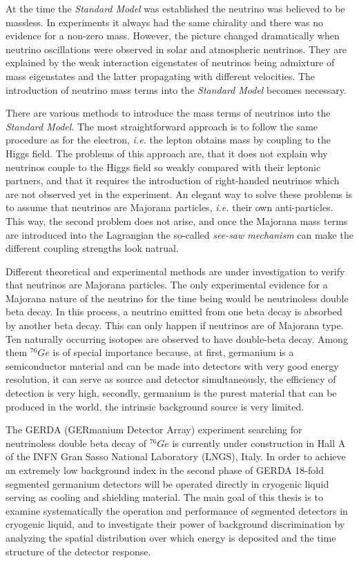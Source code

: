 At the time the \emph{Standard Model} was established the neutrino was
believed to be massless. In experiments it always had the same
chirality and there was no evidence for a non-zero mass. However, the
picture changed dramatically when neutrino oscillations were observed
in solar and atmospheric neutrinos. They are explained by the weak
interaction eigenstates of neutrinos being admixture of mass
eigenstates and the latter propagating with different velocities. The
introduction of neutrino mass terms into the \emph{Standard Model}
becomes necessary.

There are various methods to introduce the mass terms of neutrinos
into the \emph{Standard Model}. The most straightforward approach is
to follow the same procedure as for the electron, \textit{i.e.} the
lepton obtains mass by coupling to the Higgs field. The problems of
this approach are, that it does not explain why neutrinos couple to
the Higgs field so weakly compared with their leptonic partners, and
that it requires the introduction of right-handed neutrinos which are
not observed yet in the experiment. An elegant way to solve these
problems is to assume that neutrinos are Majorana particles,
\textit{i.e.} their own anti-particles. This way, the second problem
does not arise, and once the Majorana mass terms are introduced into
the Lagrangian the so-called \emph{see-saw mechanism} can make the
different coupling strengths look natrual.

Different theoretical and experimental methods are under investigation
to verify that neutrinos are Majorana particles. The only experimental
evidence for a Majorana nature of the neutrino for the time being
would be neutrinoless double beta decay. In this process, a neutrino
emitted from one beta decay is absorbed by another beta decay. This
can only happen if neutrinos are of Majorana type. Ten naturally
occurring isotopes are observed to have double-beta decay. Among them
$^{76}Ge$ is of special importance because, at first, germanium is a
semiconductor material and can be made into detectors with very good
energy resolution, it can serve as source and detector simultaneously,
the efficiency of detection is very high, secondly, germanium is the
purest material that can be produced in the world, the intrinsic
background source is very limited.

The GERDA (GERmanium Detector Array) experiment searching for
neutrinoless double beta decay of $^{76}Ge$ is currently under
construction in Hall A of the INFN Gran Sasso National Laboratory
(LNGS), Italy. In order to achieve an extremely low background index
in the second phase of GERDA 18-fold segmented germanium detectors
will be operated directly in cryogenic liquid serving as cooling and
shielding material. The main goal of this thesis is to examine
systematically the operation and performance of segmented detectors in
cryogenic liquid, and to investigate their power of background
discrimination by analyzing the spatial distribution over which energy
is deposited and the time structure of the detector response.

